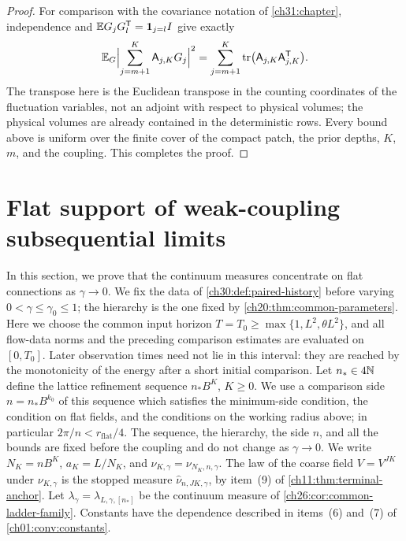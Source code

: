\begin{proof}
For comparison with the covariance notation of \cref{ch31:chapter}, independence and $\mathbb E G_jG_l^{\mathsf T}=\mathbf 1_{j=l}I$ give exactly
\[
 \mathbb E_G\Bigl\lvert\sum_{j=m+1}^K\mathsf A_{j,K}G_j\Bigr\rvert^2=\sum_{j=m+1}^K\operatorname{tr}\bigl(\mathsf A_{j,K}\mathsf A_{j,K}^{\mathsf T}\bigr).
\]
The transpose here is the Euclidean transpose in the counting coordinates of the fluctuation variables, not an adjoint with respect to physical volumes; the physical volumes are already contained in the deterministic rows. Every bound above is uniform over the finite cover of the compact patch, the prior depths, $K$, $m$, and the coupling. This completes the proof.
\end{proof}

\section{Flat support of weak-coupling subsequential limits}\label{ch30:sec:flat}

In this section, we prove that the continuum measures concentrate on flat connections as $\gamma\to0$. We fix the data of \cref{ch30:def:paired-history} before varying $0<\gamma\le\gamma_0\le1$; the hierarchy is the one fixed by \cref{ch20:thm:common-parameters}. Here we choose the common input horizon $T=T_0\ge\max\{1,L^2,\theta L^2\}$, and all flow-data norms and the preceding comparison estimates are evaluated on $[0,T_0]$. Later observation times need not lie in this interval: they are reached by the monotonicity of the energy after a short initial comparison. Let $n_*\in4\mathbb N$ define the lattice refinement sequence $n_*B^K$, $K\ge0$. We use a comparison side $n=n_*B^{k_0}$ of this sequence which satisfies the minimum-side condition, the condition on flat fields, and the conditions on the working radius above; in particular $2\pi/n<r_{\mathrm{flat}}/4$. The sequence, the hierarchy, the side $n$, and all the bounds are fixed before the coupling and do not change as $\gamma\to0$. We write $N_K=nB^K$, $a_K=L/N_K$, and $\nu_{K,\gamma}=\nu_{N_K,n,\gamma}$. The law of the coarse field $V=V^{JK}$ under $\nu_{K,\gamma}$ is the stopped measure $\widehat\nu_{n,JK,\gamma}$, by item~(9) of \cref{ch11:thm:terminal-anchor}. Let $\lambda_\gamma=\lambda_{L,\gamma,[n_*]}$ be the continuum measure of \cref{ch26:cor:common-ladder-family}. Constants have the dependence described in items~(6) and~(7) of \cref{ch01:conv:constants}.

